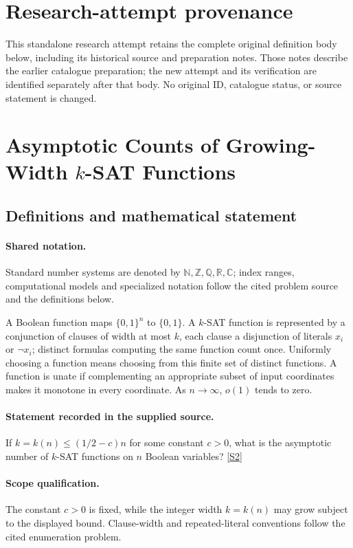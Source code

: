 \documentclass[11pt]{article}
\begin{document}
\section*{Research-attempt provenance}
This standalone research attempt retains the complete original definition body below,
including its historical source and preparation notes. Those notes describe the
earlier catalogue preparation; the new attempt and its verification are identified
separately after that body. No original ID, catalogue status, or source statement is changed.

\section{Asymptotic Counts of Growing-Width $k$-SAT Functions}\label{statement}

\subsection{Definitions and mathematical statement}

\paragraph{Shared notation.}Standard number systems are denoted by $\mathbb N,\mathbb Z,\mathbb Q,\mathbb R,\mathbb C$; index ranges, computational models and specialized notation follow the cited problem source and the definitions below.


A Boolean function maps $\{0,1\}^n$ to $\{0,1\}$. A $k$-SAT function is represented by a conjunction of clauses of width at most $k$, each clause a disjunction of literals $x_i$ or $\neg x_i$; distinct formulas computing the same function count once. Uniformly choosing a function means choosing from this finite set of distinct functions. A function is unate if complementing an appropriate subset of input coordinates makes it monotone in every coordinate. As $n\to\infty$, $o(1)$ tends to zero.
\paragraph{Statement recorded in the supplied source.}
If $k=k(n)\leq(1/2-c)n$ for some constant $c>0$, what is the asymptotic number of $k$-SAT functions on $n$ Boolean variables? \href{https://doi.org/10.4171/owr/2022/22}{[S2]}
\paragraph{Scope qualification.}
The constant $c>0$ is fixed, while the integer width $k=k(n)$ may grow subject to the displayed bound. Clause-width and repeated-literal conventions follow the cited enumeration problem.
\end{document}
